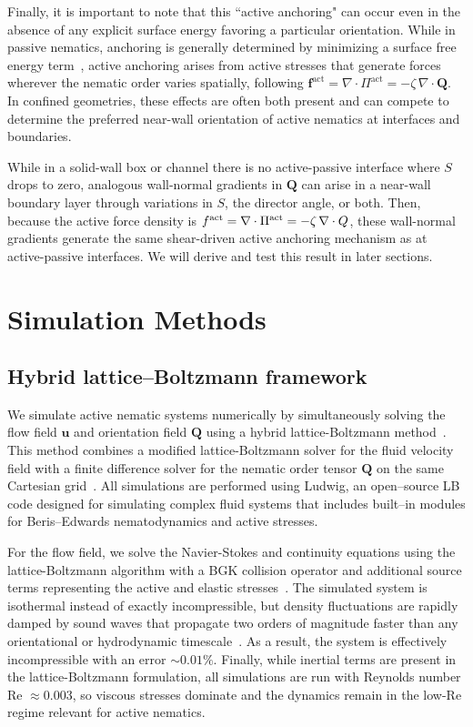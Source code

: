 \documentclass[11pt]{article}
\begin{document}
Finally, it is important to note that this ``active anchoring" can occur even in the absence of any explicit surface energy favoring a particular orientation. While in passive nematics, anchoring is generally determined by minimizing a surface free energy term~\cite{degennes1993physics}, active anchoring arises from active stresses that generate forces wherever the nematic order varies spatially, following $\mathbf{f}^{\mathrm{act}}=\nabla\cdot\Pi^{\mathrm{act}}=-\zeta\,\nabla\cdot\mathbf{Q}$. In confined geometries, these effects are often both present and can compete to determine the preferred near-wall orientation of active nematics at interfaces and boundaries.

While in a solid-wall box or channel there is no active-passive interface where $S$ drops to zero, analogous wall-normal gradients in $\mathbf{Q}$ can arise in a near-wall boundary layer through variations in $S$, the director angle, or both. Then, because the active force density is $f^{\rm act}=\nabla\cdot\Pi^{\rm act}=-\zeta\,\nabla\cdot Q$, these wall-normal gradients generate the same shear-driven active anchoring mechanism as at active-passive interfaces. We will derive and test this result in later sections. 

\section{Simulation Methods}

\subsection{Hybrid lattice--Boltzmann framework}
\label{sec:LB-framework}

We simulate active nematic systems numerically by simultaneously solving the flow field $\mathbf{u}$ and orientation field $\mathbf{Q}$ using a hybrid lattice-Boltzmann method~\cite{marenduzzo2007steady}. This method combines a modified lattice-Boltzmann solver for the fluid velocity field with a finite difference solver for the nematic order tensor $\mathbf{Q}$ on the same Cartesian grid~\cite{Krueger2016LatticeBoltzmann}. All simulations are performed using Ludwig, an open--source LB code designed for simulating complex fluid systems that includes built--in modules for Beris–Edwards nematodynamics and active stresses.

For the flow field, we solve the Navier-Stokes and continuity equations using the lattice-Boltzmann algorithm with a BGK collision operator and additional source terms representing the active and elastic stresses~\cite{Krueger2016LatticeBoltzmann}. The simulated system is isothermal instead of exactly incompressible, but density fluctuations are rapidly damped by sound waves that propagate two orders of magnitude faster than any orientational or hydrodynamic timescale~\cite{KusumaatmajaYeomans2010LBWettingDrop}. As a result, the system is effectively incompressible with an error $\sim 0.01\%$. Finally, while inertial terms are present in the lattice-Boltzmann formulation, all simulations are run with Reynolds number Re $\approx 0.003$, so viscous stresses dominate and the dynamics remain in the low-Re regime relevant for active nematics. 
\end{document}

